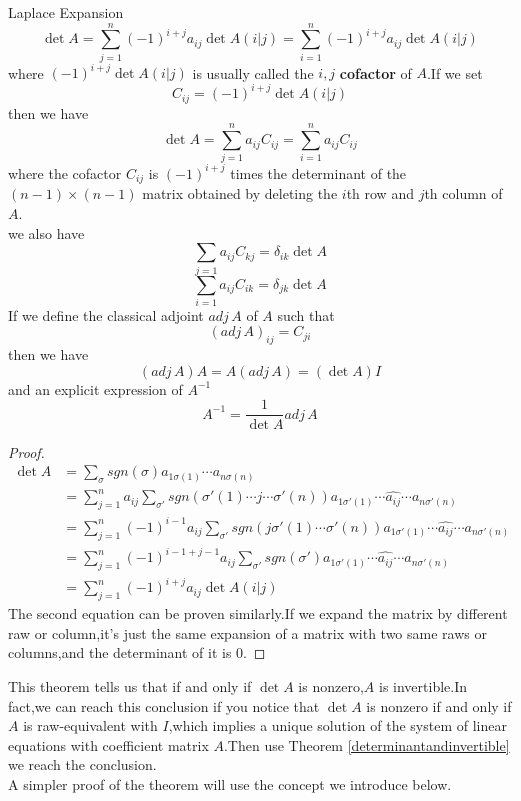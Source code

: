 \documentclass{article}
\begin{document}
\begin{thm}
	Laplace Expansion
	\[\det A=\sum\limits_{j=1}^n(-1)^{i+j}a_{ij}\det A(i|j)=\sum\limits_{i=1}^n(-1)^{i+j}a_{ij}\det A(i|j)\]
	where $(-1)^{i+j}\det A(i|j)$ is usually called the $i,j$ \textbf{cofactor} of $A$.If we set
	\[C_{ij}=(-1)^{i+j}\det A (i|j)\]
	then we have
	\[\det A=\sum\limits_{j=1}^na_{ij}C_{ij}=\sum\limits_{i=1}^na_{ij}C_{ij}\]
	where the cofactor $C_{ij}$ is $(-1)^{i+j}$ times the determinant of the $(n-1)\times(n-1)$ matrix obtained by deleting the $i$th row and $j$th column of $A$.\\
	we also have
	\[\sum\limits_{j=1}a_{ij}C_{kj}=\delta_{ik}\det A\]  
	\[\sum\limits_{i=1}a_{ij}C_{ik}=\delta_{jk}\det A\]
	If we define the classical adjoint $adj\,A$ of $A$ such that
	\[(adj\,A)_{ij}=C_{ji}\]
	then we have
	\[(adj\,A)A=A(adj\,A)=(\det A)I\]
	and an explicit expression of $A^{-1}$
	\[A^{-1}=\frac{1}{\det A}adj\,A\]
\end{thm}
\begin{proof}
	\begin{align*}
		\det A&=\sum\limits_{\sigma}sgn(\sigma)a_{1\sigma(1)}\cdots a_{n\sigma(n)}\\
		&=\sum\limits_{j=1}^na_{ij}\sum\limits_{\sigma'}sgn(\sigma'(1)\cdots j\cdots\sigma'(n))a_{1\sigma'(1)}\cdots\widehat{a_{ij}}\cdots a_{n\sigma'(n)}\\
		&=\sum\limits_{j=1}^n(-1)^{i-1}a_{ij}\sum\limits_{\sigma'}sgn(j\sigma'(1)\cdots\sigma'(n))a_{1\sigma'(1)}\cdots\widehat{a_{ij}}\cdots a_{n\sigma'(n)}\\
		&=\sum\limits_{j=1}^n(-1)^{i-1+j-1}a_{ij}\sum\limits_{\sigma'}sgn(\sigma')a_{1\sigma'(1)}\cdots\widehat{a_{ij}}\cdots a_{n\sigma'(n)}\\
		&=\sum\limits_{j=1}^n(-1)^{i+j}a_{ij}\det A(i|j)
	\end{align*}
	The second equation can be proven similarly.If we expand the matrix by different raw or column,it's just the same expansion of a matrix with two same raws or columns,and the determinant of it is $0$. 
\end{proof}
This theorem tells us that if and only if $\det A$ is nonzero,$A$ is invertible.In fact,we can reach this conclusion if you notice that $\det A$ is nonzero if and only if $A$ is raw-equivalent with $I$,which implies a unique solution of the system of linear equations with coefficient matrix $A$.Then use Theorem \ref{determinantandinvertible} we reach the conclusion.\\
\indent A simpler proof of the theorem will use the concept we introduce below.
\end{document}
